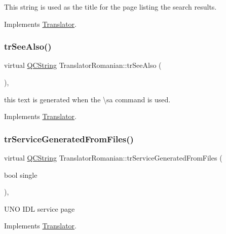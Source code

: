 This string is used as the title for the page listing the search results. 

Implements \mbox{\hyperlink{class_translator}{Translator}}.

\mbox{\label{class_translator_romanian_a95e3059c2b9a47a82d50ca8f03b5fb7e}} 
\subsubsection{\texorpdfstring{trSeeAlso()}{trSeeAlso()}}
{\footnotesize\ttfamily virtual \mbox{\hyperlink{class_q_c_string}{Q\+C\+String}} Translator\+Romanian\+::tr\+See\+Also (\begin{DoxyParamCaption}{ }\end{DoxyParamCaption})\hspace{0.3cm}{\ttfamily [inline]}, {\ttfamily [virtual]}}

this text is generated when the \textbackslash{}sa command is used. 

Implements \mbox{\hyperlink{class_translator}{Translator}}.

\mbox{\label{class_translator_romanian_a010b6b54a93d77c4f4976e61251df27f}} 
\subsubsection{\texorpdfstring{trServiceGeneratedFromFiles()}{trServiceGeneratedFromFiles()}}
{\footnotesize\ttfamily virtual \mbox{\hyperlink{class_q_c_string}{Q\+C\+String}} Translator\+Romanian\+::tr\+Service\+Generated\+From\+Files (\begin{DoxyParamCaption}\item[{bool}]{single }\end{DoxyParamCaption})\hspace{0.3cm}{\ttfamily [inline]}, {\ttfamily [virtual]}}

U\+NO I\+DL service page 

Implements \mbox{\hyperlink{class_translator}{Translator}}.

\mbox{\label{class_translator_romanian_a876c5d905c8540807a859eb7a796100f}} 
